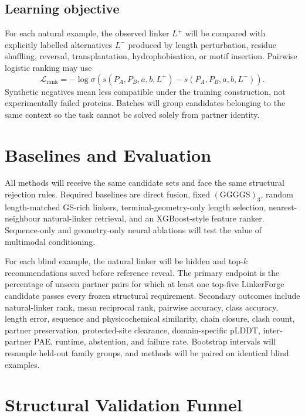\documentclass[10pt,a4paper]{article}
\begin{document}
\subsection{Learning objective}

For each natural example, the observed linker $L^{+}$ will be compared with explicitly labelled alternatives $L^{-}$ produced by length perturbation, residue shuffling, reversal, transplantation, hydrophobisation, or motif insertion. Pairwise logistic ranking may use
\begin{equation}
  \mathcal{L}_{\mathrm{rank}} = -\log \sigma\!\left(s(P_A,P_B,a,b,L^{+})-s(P_A,P_B,a,b,L^{-})\right).
\end{equation}
Synthetic negatives mean less compatible under the training construction, not experimentally failed proteins. Batches will group candidates belonging to the same context so the task cannot be solved solely from partner identity.

\section{Baselines and Evaluation}

All methods will receive the same candidate sets and face the same structural rejection rules. Required baselines are direct fusion, fixed $(\mathrm{GGGGS})_3$, random length-matched GS-rich linkers, terminal-geometry-only length selection, nearest-neighbour natural-linker retrieval, and an XGBoost-style feature ranker. Sequence-only and geometry-only neural ablations will test the value of multimodal conditioning.

For each blind example, the natural linker will be hidden and top-$k$ recommendations saved before reference reveal. The primary endpoint is the percentage of unseen partner pairs for which at least one top-five LinkerForge candidate passes every frozen structural requirement. Secondary outcomes include natural-linker rank, mean reciprocal rank, pairwise accuracy, class accuracy, length error, sequence and physicochemical similarity, chain closure, clash count, partner preservation, protected-site clearance, domain-specific pLDDT, inter-partner PAE, runtime, abstention, and failure rate. Bootstrap intervals will resample held-out family groups, and methods will be paired on identical blind examples.

\section{Structural Validation Funnel}
\end{document}
